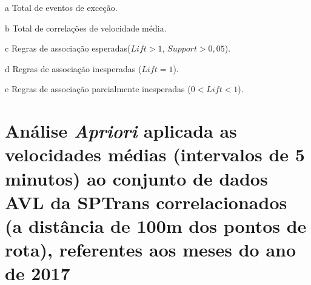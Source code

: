 \documentclass[
	12pt,				%
	oneside,			%
	a4paper,			%
	english,			%
	brazil				%
	]{abntex2ppgsi}
\begin{document}
{{\begin{apendicesenv}
\begin{table}[!htb]
\begin{threeparttable}
\begin{tablenotes}
            \item[a] Total de eventos de exceção.
            \item[b] Total de correlações de velocidade média.
            \item[c] Regras de associação esperadas($Lift > 1$, $Support > 0,05$).
            \item[d] Regras de associação inesperadas ($Lift = 1$).
            \item[e] Regras de associação parcialmente inesperadas ($0 < Lift < 1$).
        \end{tablenotes}
\end{threeparttable}
\end{table}

\clearpage

\section{Análise \textit{Apriori} aplicada as velocidades médias (intervalos de 5 minutos) ao conjunto de dados AVL da SPTrans correlacionados (a distância de 100m dos pontos de rota), referentes aos meses do ano de 2017}
\label{g5}


\end{apendicesenv}}}
\end{document}
